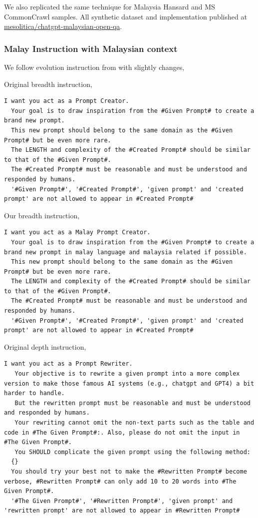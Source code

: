 \documentclass{article}
\begin{document}
We also replicated the same technique for Malaysia Hansard and MS CommonCrawl samples. All synthetic dataset and implementation published at \href{https://huggingface.co/datasets/mesolitica/chatgpt-malaysian-open-qa}{mesolitica/chatgpt-malaysian-open-qa}.

\pagebreak

\subsubsection{Malay Instruction with Malaysian context}

We follow evolution instruction from \cite{xu2023wizardlm} with slightly changes,

Original breadth instruction,

\begin{lstlisting}[]
  I want you act as a Prompt Creator.
  Your goal is to draw inspiration from the #Given Prompt# to create a brand new prompt.
  This new prompt should belong to the same domain as the #Given Prompt# but be even more rare.
  The LENGTH and complexity of the #Created Prompt# should be similar to that of the #Given Prompt#.
  The #Created Prompt# must be reasonable and must be understood and responded by humans.
  '#Given Prompt#', '#Created Prompt#', 'given prompt' and 'created prompt' are not allowed to appear in #Created Prompt#
\end{lstlisting}

Our breadth instruction,

\begin{lstlisting}[]
  I want you act as a Malay Prompt Creator.
  Your goal is to draw inspiration from the #Given Prompt# to create a brand new prompt in malay language and malaysia related if possible.
  This new prompt should belong to the same domain as the #Given Prompt# but be even more rare.
  The LENGTH and complexity of the #Created Prompt# should be similar to that of the #Given Prompt#.
  The #Created Prompt# must be reasonable and must be understood and responded by humans.
  '#Given Prompt#', '#Created Prompt#', 'given prompt' and 'created prompt' are not allowed to appear in #Created Prompt#
\end{lstlisting}


Original depth instruction,

\begin{lstlisting}[]
  I want you act as a Prompt Rewriter.
   Your objective is to rewrite a given prompt into a more complex version to make those famous AI systems (e.g., chatgpt and GPT4) a bit harder to handle.
   But the rewritten prompt must be reasonable and must be understood and responded by humans.
   Your rewriting cannot omit the non-text parts such as the table and code in #The Given Prompt#:. Also, please do not omit the input in #The Given Prompt#. 
   You SHOULD complicate the given prompt using the following method: 
  {} 
  You should try your best not to make the #Rewritten Prompt# become verbose, #Rewritten Prompt# can only add 10 to 20 words into #The Given Prompt#. 
  '#The Given Prompt#', '#Rewritten Prompt#', 'given prompt' and 'rewritten prompt' are not allowed to appear in #Rewritten Prompt#
\end{lstlisting}
\end{document}
